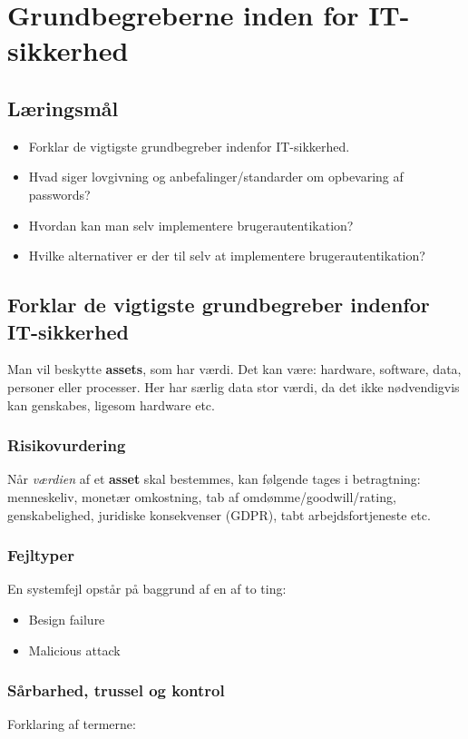 \section{Grundbegreberne inden for IT-sikkerhed}

\subsection{Læringsmål}

\begin{itemize}
	\item Forklar de vigtigste grundbegreber indenfor IT-sikkerhed.
	\item Hvad siger lovgivning og anbefalinger/standarder om opbevaring af	passwords?
	\item Hvordan kan man selv implementere brugerautentikation?
	\item Hvilke alternativer er der til selv at implementere brugerautentikation?
\end{itemize}

\subsection{Forklar de vigtigste grundbegreber indenfor IT-sikkerhed}
Man vil beskytte \textbf{assets}, som har værdi. Det kan være: hardware, software, data, personer eller processer. Her har særlig data stor værdi, da det ikke nødvendigvis kan genskabes, ligesom hardware etc.

\subsubsection{Risikovurdering}
Når \textit{værdien} af et \textbf{asset} skal bestemmes, kan følgende tages i betragtning: menneskeliv, monetær omkostning, tab af omdømme/goodwill/rating, genskabelighed, juridiske konsekvenser (GDPR), tabt arbejdsfortjeneste etc.

\subsubsection{Fejltyper}
En systemfejl opstår på baggrund af en af to ting: 

\begin{itemize}
	\item Besign failure
	\item Malicious attack
\end{itemize}

\subsubsection{Sårbarhed, trussel og kontrol}
Forklaring af termerne:


